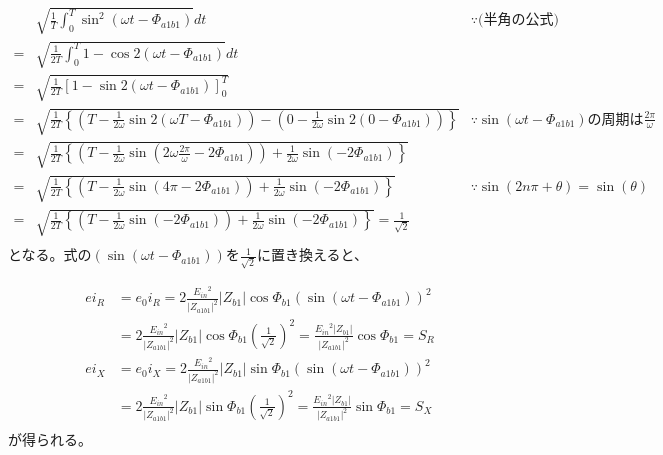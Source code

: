 \documentclass[fleqn,11pt,a4paper,dvipdfmx]{jsarticle}
\numberwithin{equation}{section}
\begin{document}
\begin{align*}
    & \sqrt{\frac{1}{T} \int_{0}^{T}  \sin^2 \left( \omega t - \Phi_{a1b1}\right)} dt               &\because \text{(半角の公式)}\\
  = & \sqrt{ \frac{1}{2T} \int_{0}^{T}  1 - \cos 2 \left( \omega t - \Phi_{a1b1}\right)} dt         \\
  = & \sqrt{ \frac{1}{2T} \left[  1 - \sin 2 \left( \omega t - \Phi_{a1b1}\right) \right]_{0}^{T}}  \\
  = & \sqrt{ \frac{1}{2T} \left\{ \left(T - \frac{1}{2\omega} \sin 2 \left( \omega T - \Phi_{a1b1}\right)\right) - 
  \left(0 - \frac{1}{2\omega} \sin 2 \left( 0 - \Phi_{a1b1}\right)\right) \right\} }  
  &\because  \sin \left(\omega t - \Phi_{a1b1}\right)\text{の周期は}\frac{2\pi}{\omega}\\
  = & \sqrt{ \frac{1}{2T} \left\{ \left(T - \frac{1}{2\omega} \sin \left(2 \omega \frac{2\pi}{\omega} - 2\Phi_{a1b1}\right)\right) + 
  \frac{1}{2\omega} \sin \left(-2\Phi_{a1b1}\right) \right\} }  \\
  = & \sqrt{ \frac{1}{2T} \left\{ \left(T - \frac{1}{2\omega} \sin \left(4\pi - 2\Phi_{a1b1}\right)\right) + 
  \frac{1}{2\omega} \sin \left(-2\Phi_{a1b1}\right) \right\} }  &\because \sin \left(2n\pi + \theta\right) = \sin \left(\theta\right)\\
  = & \sqrt{ \frac{1}{2T} \left\{ \left(T - \frac{1}{2\omega} \sin \left(- 2\Phi_{a1b1}\right)\right) + 
  \frac{1}{2\omega} \sin \left(-2\Phi_{a1b1}\right) \right\} }  = \frac{1}{\sqrt{2}} \\
\end{align*}
となる。式の$\left(\sin \left( \omega t - \Phi_{a1b1}\right)\right)$を$\frac{1}{\sqrt{2}}$に置き換えると、

\begin{align*}
  ei_R  &= e_0 i_R = 2 \frac{{E_{in}}^2}{{\left|Z_{a1b1}\right|}^2} \left|Z_{b1}\right| \cos \Phi_{b1} {\left(\sin \left( \omega t - \Phi_{a1b1}\right)\right)}^2 \\
        &= 2 \frac{{E_{in}}^2}{{\left|Z_{a1b1}\right|}^2} \left|Z_{b1}\right| \cos \Phi_{b1} \left({\frac{1}{\sqrt{2}}}\right)^2 = \frac{{E_{in}}^2 \left|Z_{b1}\right|}{{\left|Z_{a1b1}\right|}^2}\cos\Phi_{b1} = S_R  \\
  ei_X  &= e_0 i_X = 2 \frac{{E_{in}}^2}{{\left|Z_{a1b1}\right|}^2} \left|Z_{b1}\right| \sin \Phi_{b1} {\left(\sin \left( \omega t - \Phi_{a1b1}\right)\right)}^2 \\
        &= 2 \frac{{E_{in}}^2}{{\left|Z_{a1b1}\right|}^2} \left|Z_{b1}\right| \sin \Phi_{b1} \left({\frac{1}{\sqrt{2}}}\right)^2 = \frac{{E_{in}}^2 \left|Z_{b1}\right|}{{\left|Z_{a1b1}\right|}^2}\sin\Phi_{b1} = S_X  \\
\end{align*}
が得られる。
\end{document}
